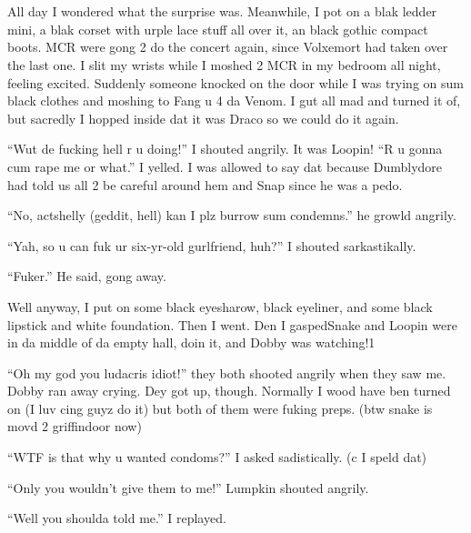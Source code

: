 \section{}



All day I wondered what the surprise was. Meanwhile, I pot on a blak ledder mini, a blak corset with urple lace stuff all over it, an black gothic compact boots. MCR were gong 2 do the concert again, since Volxemort had taken over the last one. I slit my wrists while I moshed 2 MCR in my bedroom all night, feeling excited. Suddenly someone knocked on the door while I was trying on sum black clothes and moshing to Fang u 4 da Venom. I gut all mad and turned it of, but sacredly I hopped inside dat it was Draco so we could do it again.

\enquote{Wut de fucking hell r u doing!} I shouted angrily. It was Loopin! \enquote{R u gonna cum rape me or what.} I yelled. I was allowed to say dat because Dumblydore had told us all 2 be careful around hem and Snap since he was a pedo.

\enquote{No, actshelly (geddit, hell) kan I plz burrow sum condemns.} he growld angrily.

\enquote{Yah, so u can fuk ur six-yr-old gurlfriend, huh?} I shouted sarkastikally.

\enquote{Fuker.} He said, gong away.

Well anyway, I put on some black eyesharow, black eyeliner, and some black lipstick and white foundation. Then I went. Den I gasped\dotfill\newline Snake and Loopin were in da middle of da empty hall, doin it, and Dobby was watching!1

\enquote{Oh my god you ludacris idiot!} they both shooted angrily when they saw me. Dobby ran away crying. Dey got up, though. Normally I wood have ben turned on (I luv cing guyz do it) but both of them were fuking preps. (btw snake is movd 2 griffindoor now)

\enquote{WTF is that why u wanted condoms?} I asked sadistically. (c I speld dat)

\enquote{Only you wouldn't give them to me!} Lumpkin shouted angrily.

\enquote{Well you shoulda told me.} I replayed.


